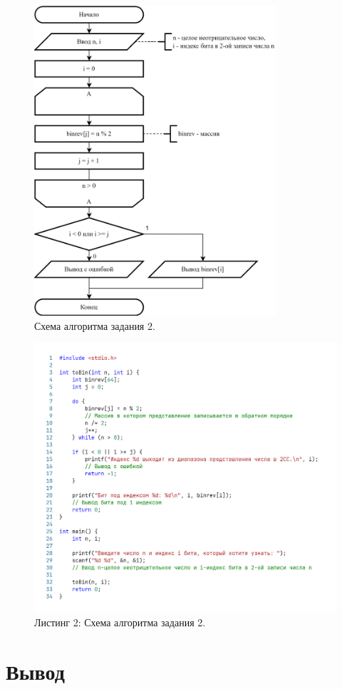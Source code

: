 \documentclass[oneside,a4paper,14pt]{extarticle} %
\begin{document}
\begin{figure}[h!]
	\centering
	\includegraphics[width=0.8\textwidth]{pics/2-flowchart.png}
	\caption{Схема алгоритма задания 2.}
\end{figure}
\newpage
\begin{figure}[h!]
	\centering
	\includegraphics[width=1\textwidth]{pics/2-listing.png}
	\caption*{Листинг 2: Схема алгоритма задания 2.}
\end{figure}
\newpage
\section*{Вывод}
\end{document}
